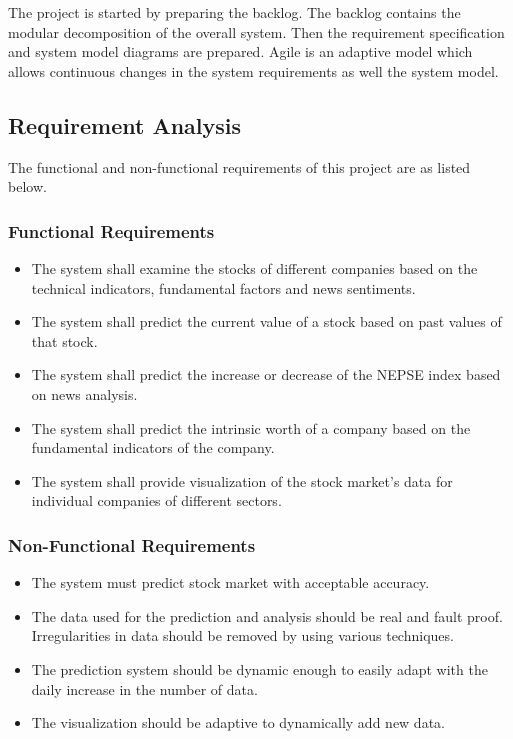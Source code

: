 The project is started by preparing the backlog. The backlog contains the modular decomposition of the overall system. Then the requirement specification and system model diagrams are prepared. Agile is an adaptive model which allows continuous changes in the system requirements as well the system model.

\subsection{Requirement Analysis}
The functional and non-functional requirements of this project are as listed below.
\subsubsection{Functional Requirements}
\begin{itemize}
	\item The system shall examine the stocks of different companies based on the technical indicators, fundamental factors and news sentiments.
	\item The system shall predict the current value of a stock based on past values of that stock.
	\item The system shall predict the increase or decrease of the NEPSE index based on news analysis.
	\item The system shall predict the intrinsic worth of a company based on the fundamental indicators of the company.
	\item The system shall provide visualization of the stock market's data for individual companies of different sectors.
\end{itemize}

\subsubsection{ Non-Functional Requirements}
\begin{itemize}
	 \item The system must predict stock market with acceptable accuracy.  
	\item The data used for the prediction and analysis should be real and fault proof. Irregularities in data should be removed by using various techniques.
	\item The prediction system should be dynamic enough to easily adapt with the daily increase in the number of data.
	\item The visualization should be adaptive to dynamically add new data.
\end{itemize}

